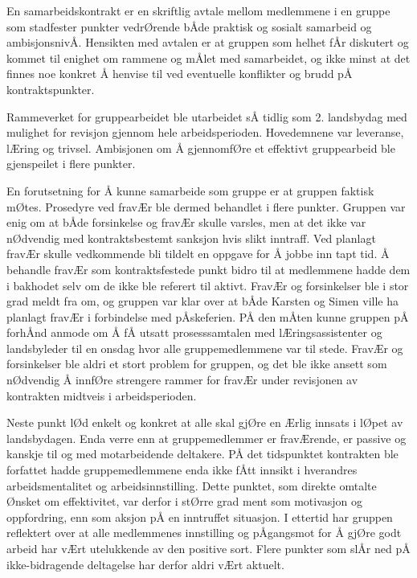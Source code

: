 En samarbeidskontrakt er en skriftlig avtale mellom medlemmene i en gruppe som stadfester punkter vedrØrende bÅde praktisk og sosialt samarbeid og ambisjonsnivÅ. 
Hensikten med avtalen er at gruppen som helhet fÅr diskutert og kommet til enighet om rammene og mÅlet med samarbeidet, og ikke minst at det finnes noe konkret Å henvise til ved eventuelle konflikter og brudd pÅ kontraktspunkter. 

Rammeverket for gruppearbeidet ble utarbeidet sÅ tidlig som 2. landsbydag med mulighet for revisjon gjennom hele arbeidsperioden. 
Hovedemnene var leveranse, lÆring og trivsel.
Ambisjonen om Å gjennomfØre et effektivt gruppearbeid ble gjenspeilet i flere punkter. 

En forutsetning for Å kunne samarbeide som gruppe er at gruppen faktisk mØtes. 
Prosedyre ved fravÆr ble dermed behandlet i flere punkter. 
Gruppen var enig om at bÅde forsinkelse og fravÆr skulle varsles, men at det ikke var nØdvendig med kontraktsbestemt sanksjon hvis slikt inntraff. 
Ved planlagt fravÆr skulle vedkommende bli tildelt en oppgave for Å jobbe inn tapt tid. 
Å behandle fravÆr som kontraktsfestede punkt bidro til at medlemmene hadde dem i bakhodet selv om de ikke ble referert til aktivt.
FravÆr og forsinkelser ble i stor grad meldt fra om, og gruppen var klar over at bÅde Karsten og Simen ville ha planlagt fravÆr i forbindelse med pÅskeferien. 
PÅ den mÅten kunne gruppen pÅ forhÅnd anmode om Å fÅ utsatt prosesssamtalen med lÆringsassistenter og landsbyleder til en onsdag hvor alle gruppemedlemmene var til stede.
FravÆr og forsinkelser ble aldri et stort problem for gruppen, og det ble ikke ansett som nØdvendig Å innfØre strengere rammer for fravÆr under revisjonen av kontrakten midtveis i arbeidsperioden. 

Neste punkt lØd enkelt og konkret at alle skal gjØre en Ærlig innsats i lØpet av landsbydagen.
Enda verre enn at gruppemedlemmer er fravÆrende, er passive og kanskje til og med motarbeidende deltakere.
PÅ det tidspunktet kontrakten ble forfattet hadde gruppemedlemmene enda ikke fÅtt innsikt i hverandres arbeidsmentalitet og arbeidsinnstilling.
Dette punktet, som direkte omtalte Ønsket om effektivitet, var derfor i stØrre grad ment som motivasjon og oppfordring, enn som aksjon pÅ en inntruffet situasjon.
I ettertid har gruppen reflektert over at alle medlemmenes innstilling og pÅgangsmot for Å gjØre godt arbeid har vÆrt utelukkende av den positive sort.
Flere punkter som slÅr ned pÅ ikke-bidragende deltagelse har derfor aldri vÆrt aktuelt.

